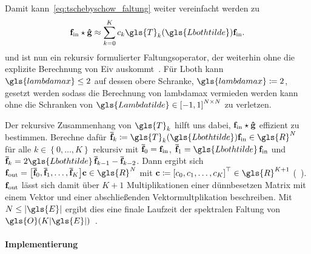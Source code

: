 Damit kann~\eqref{eq:tschebyschow_faltung} weiter vereinfacht werden zu
\begin{equation}
  \ve{f}_{\mathrm{in}} \star \ve{\hat g} \approx \sum_{k=0}^K c_k\gls{T}_k\left(\gls{Lbothtilde}\right)\ve{f}_{\mathrm{in}}.
  \label{eq:tschebyschow_faltung_L}
\end{equation}
und ist nun ein rekursiv formulierter Faltungsoperator, der weiterhin ohne die explizite Berechnung von \gls{Eiv} auskommt~\cite{Defferrard}.
Für \gls{Lboth} kann $\gls{lambdamax} \leq 2$ auf dessen obere Schranke, \dhe{} $\gls{lambdamax} \coloneqq 2$, gesetzt werden sodass die Berechnung von \gls{lambdamax} vermieden werden kann ohne die Schranken von $\gls{Lambdatilde} \in {\left[-1, 1\right]}^{N \times N}$ zu verletzen.

Der rekursive Zusammenhang von $\gls{T}_k$ hilft uns dabei, $\mathbf{f}_{\mathrm{in}} \star \mathbf{\hat g}$ effizient zu bestimmen.
Berechne dafür $\ve{\bar f}_k \coloneqq \gls{T}_k\left(\gls{Lbothtilde}\right)\ve{f}_{\mathrm{in}} \in \gls{R}^N$ für alle $k \in \left\lbrace0, \ldots, K\right\rbrace$ rekursiv mit $\mathbf{\bar f}_0 = \mathbf{f}_{\mathrm{in}}$, $\ve{\bar f}_1 = \gls{Lbothtilde}\,\ve{f}_{\mathrm{in}}$ und $\ve{\bar f}_k = 2 \gls{Lbothtilde}\,\ve{\bar f}_{k-1} - \ve{\bar f}_{k - 2}$.
Dann ergibt sich $\ve{f}_{\mathrm{out}} = \left[\ve{\bar f}_0, \ve{\bar f}_1, \ldots, \ve{\bar f}_K\right]\ve{c} \in \gls{R}^N$ mit $\ve{c} \coloneqq {\left[c_0, c_1, \ldots, c_K\right]}^{\top} \in \gls{R}^{K+1}$ (\vgl{}~\cite{Hammond}).
$\mathbf{f}_{\mathrm{out}}$ lässt sich damit über $K + 1$ Multiplikationen einer dünnbesetzen Matrix mit einem Vektor und einer abschließenden Vektormultplikation beschreiben.
Mit $N \leq \left|\gls{E}\right|$ ergibt dies eine finale Laufzeit der spektralen Faltung von $\gls{O}\left(K\left|\gls{E}\right|\right)$~\cite{Defferrard}.

\paragraph{Implementierung}
\label{tschebyschow_tensor}

